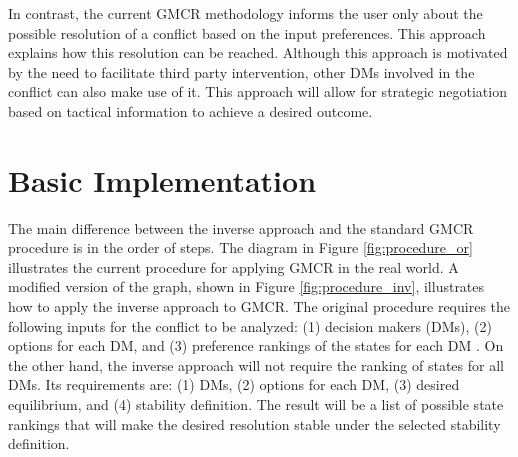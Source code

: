 \documentclass[letterpaper,12pt,titlepage,oneside,final]{book}
\begin{document}
In contrast, the current GMCR methodology informs the user only about the possible resolution of a conflict based on the input preferences. This approach explains how this resolution can be reached. Although this approach is motivated by the need to facilitate third party intervention, other DMs involved in the conflict can also make use of it. This approach will allow for strategic negotiation based on tactical information to achieve a desired outcome.



\section{Basic Implementation}

The main difference between the inverse approach and the standard GMCR procedure is in the order of steps. The diagram in Figure \ref{fig:procedure_or} illustrates the current procedure for applying GMCR in the real world. A modified version of the graph, shown in Figure \ref{fig:procedure_inv}, illustrates how to apply the inverse approach to GMCR. The original procedure requires the following inputs for the conflict to be analyzed: (1) decision makers (DMs), (2) options for each DM, and (3) preference rankings of the states for each DM \citep{Fang1989,fang1993}. On the other hand, the inverse approach will not require the ranking of states for all DMs. Its requirements are: (1) DMs, (2) options for each DM, (3) desired equilibrium, and (4) stability definition. The result will be a list of possible state rankings that will make the desired resolution stable under the selected stability definition.
\end{document}
